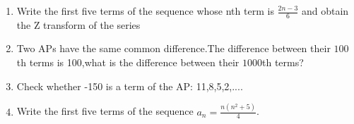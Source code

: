 \begin{enumerate}[label=\thesection.\arabic*,ref=\thesection.\theenumi]
\item Write the first five terms of the sequence whose nth term is $\frac{2n-3}{6}$ and obtain the Z transform of the series\\
\solution

\pagebreak

\item Two APs have the same common difference.The difference between their $100${th} terms is 100,what is the difference between their $1000${th} terms?
\solution

\pagebreak


\item Check whether -150 is a term of the AP: 11,8,5,2,....

 \solution
 
 \pagebreak

 \item Write the first five terms of the sequence \(a_n = \frac{n(n^2+5)}{4}\).

\solution

\pagebreak


\end{enumerate}
